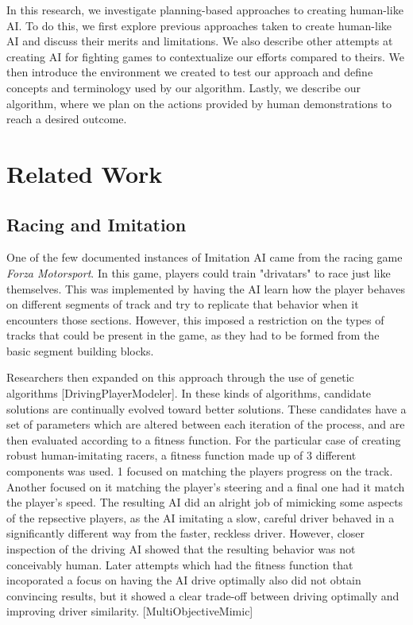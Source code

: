 \documentclass{article}
\begin{document}
In this research, we investigate planning-based approaches to creating human-like AI. To do this, we first explore previous approaches taken to create human-like AI and discuss their merits and limitations. We also describe other attempts at creating AI for fighting games to contextualize our efforts compared to theirs. We then introduce the environment we created to test our approach and define concepts and terminology used by our algorithm. Lastly, we describe our algorithm, where we plan on the actions provided by human demonstrations to reach a desired outcome.









\section{Related Work}

\subsection{Racing and Imitation}
One of the few documented instances of Imitation AI came from the racing game \textit{Forza Motorsport}. In this game, players could train "drivatars" to race just like themselves. This was implemented by having the AI learn how the player behaves on different segments of track and try to replicate that behavior when it encounters those sections. However, this imposed a restriction on the types of tracks that could be present in the game, as they had to be formed from the basic segment building blocks.

Researchers then expanded on this approach through the use of genetic algorithms [DrivingPlayerModeler]. In these kinds of algorithms, candidate solutions are continually evolved toward better solutions. These candidates have a set of parameters which are altered between each iteration of the process, and are then evaluated according to a fitness function. For the particular case of creating robust human-imitating racers, a fitness function made up of 3 different components was used. 1 focused on matching the players progress on the track. Another focused on it matching the player's steering and a final one had it match the player's speed. The resulting AI did an alright job of mimicking some aspects of the repsective players, as the AI imitating a slow, careful driver behaved in a significantly different way from the faster, reckless driver. However, closer inspection of the driving AI showed that the resulting behavior was not conceivably human. Later attempts which had the fitness function that incoporated a focus on having the AI drive optimally also did not obtain convincing results, but it showed a clear trade-off between driving optimally and improving driver similarity. [MultiObjectiveMimic]
\end{document}
